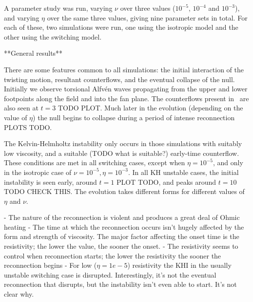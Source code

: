 A parameter study was run, varying $\nu$ over three values ($10^{-5}$, $10^{-4}$ and $10^{-3}$), and varying $\eta$ over the same three values, giving nine parameter sets in total. For each of these, two simulations were run, one using the isotropic model and the other using the switching model.

**General results**

There are some features common to all simulations: the initial interaction of the twisting motion, resultant counterflows, and the eventual collapse of the null. Initially we observe torsional Alfv\'en waves propagating from the upper and lower footpoints along the field and into the fan plane. The counterflows present in~\cite{wyperKelvinHelmholtzInstabilityCurrentvortex2013} are also seen at $t=3$ TODO PLOT. Much later in the evolution (depending on the value of $\eta$) the null begins to collapse during a period of intense reconnection PLOTS TODO.

The Kelvin-Helmholtz instability only occurs in those simulations with suitably low viscosity, and a suitable (TODO what is suitable?) early-time counterflow. These conditions are met in all switching cases, except when $\eta=10^{-5}$, and only in the isotropic case of $\nu = 10^{-5}, \eta=10^{-3}$. In all KH unstable cases, the initial instability is seen early, around $t=1$ PLOT TODO, and peaks around $t=10$ TODO CHECK THIS. The evolution takes different forms for different values of $\eta$ and $\nu$.

- The nature of the reconnection is violent and produces a great deal of Ohmic heating
- The time at which the reconnection occurs isn't hugely affected by the form and strength of viscosity. The major factor affecting the onset time is the resistivity; the lower the value, the sooner the onset.
- The resistivity seems to control when reconnection starts; the lower the resistivity the sooner the reconnection begins
- For low ($\eta=1e-5$) resistivity the KHI in the usually unstable switching case is disrupted. Interestingly, it's not the eventual reconnection that disrupts, but the instability isn't even able to start. It's not clear why.
